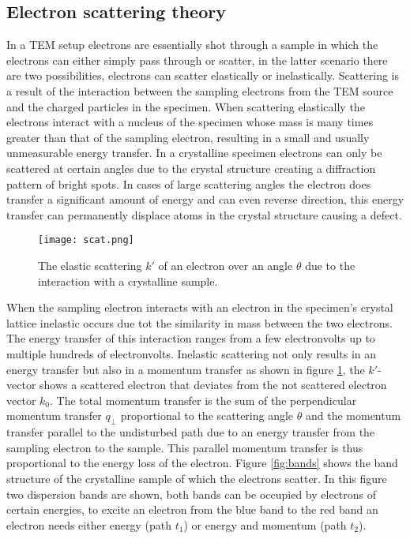 \subsection{Electron scattering theory}
In a TEM setup electrons are essentially shot through a sample in which the electrons can either simply pass through or scatter, in the latter scenario there are two possibilities, electrons can scatter elastically or inelastically.
Scattering is a result of the interaction between the sampling electrons from the TEM source and the charged particles in the specimen.
When scattering elastically the electrons interact with a nucleus of the specimen whose mass is many times greater than that of the sampling electron, resulting in a small and usually unmeasurable energy transfer. In a crystalline specimen electrons can only be scattered at certain angles due to the crystal structure creating a diffraction pattern of bright spots. In cases of large scattering angles the electron does transfer a significant amount of energy and can even reverse direction, this energy transfer can permanently displace atoms in the crystal structure causing a defect.\cite{Egerton_2008}\\
%
\begin{figure}[H]
	\centering
	\captionsetup{width=0.9\linewidth}
	\texttt{[image: scat.png]}
	\caption{The elastic scattering $k'$ of an electron over an angle $\theta$ due to the interaction with a crystalline sample.}
	\label{fig:scat}
\end{figure}
%
When the sampling electron interacts with an electron in the specimen's crystal lattice inelastic occurs due tot the similarity in mass between the two electrons. The energy transfer of this interaction ranges from a few electronvolts up to multiple hundreds of electronvolts.
Inelastic scattering not only results in an energy transfer but also in a momentum transfer as shown in figure \ref{fig:scat}, the $k'$-vector shows a scattered electron that deviates from the not scattered electron vector $k_0$.
The total momentum transfer is the sum of the perpendicular momentum transfer $q_{\perp}$ proportional to the scattering angle $\theta$ and the momentum transfer parallel to the undisturbed path due to an energy transfer from the sampling electron to the sample. This parallel momentum transfer is thus proportional to the energy loss of the electron.
Figure \ref{fig:bands} shows the band structure of the crystalline sample of which the electrons scatter. In this figure two dispersion bands are shown, both bands can be occupied by electrons of certain energies, to excite an electron from the blue band to the red band an electron needs either energy (path $t_1$) or energy and momentum (path $t_2$).
